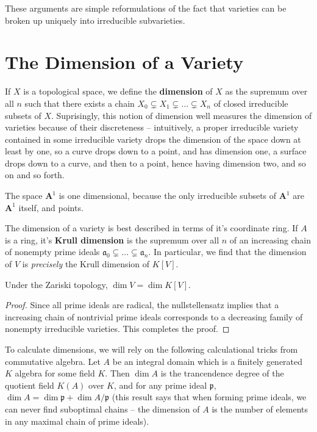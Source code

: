 These arguments are simple reformulations of the fact that varieties can be broken up uniquely into irreducible subvarieties.

\section{The Dimension of a Variety}

If $X$ is a topological space, we define the {\bf dimension} of $X$ as the supremum over all $n$ such that there exists a chain $X_0 \subsetneq X_1 \subsetneq \dots \subsetneq X_n$ of closed irreducible subsets of $X$. Suprisingly, this notion of dimension well measures the dimension of varieties because of their discreteness -- intuitively, a proper irreducible variety contained in some irreducible variety drops the dimension of the space down at least by one, so a curve drops down to a point, and has dimension one, a surface drops down to a curve, and then to a point, hence having dimension two, and so on and so forth.

\begin{example}
    The space $\mathbf{A}^1$ is one dimensional, because the only irreducible subsets of $\mathbf{A}^1$ are $\mathbf{A}^1$ itself, and points.
\end{example}

The dimension of a variety is best described in terms of it's coordinate ring. If $A$ is a ring, it's {\bf Krull dimension} is the supremum over all $n$ of an increasing chain of nonempty prime ideals $\mathfrak{a}_0 \subsetneq \dots \subsetneq \mathfrak{a}_n$. In particular, we find that the dimension of $V$ is {\it precisely} the Krull dimension of $K[V]$.

\begin{theorem}
    Under the Zariski topology, $\dim V = \dim K[V]$.
\end{theorem}
\begin{proof}
    Since all prime ideals are radical, the nullstellensatz implies that a increasing chain of nontrivial prime ideals corresponds to a decreasing family of nonempty irreducible varieties. This completes the proof.
\end{proof}

To calculate dimensions, we will rely on the following calculational tricks from commutative algebra. Let $A$ be an integral domain which is a finitely generated $K$ algebra for some field $K$. Then $\dim A$ is the trancendence degree of the quotient field $K(A)$ over $K$, and for any prime ideal $\mathfrak{p}$, $\dim A = \dim \mathfrak{p} + \dim A/\mathfrak{p}$ (this result says that when forming prime ideals, we can never find suboptimal chains -- the dimension of $A$ is the number of elements in any maximal chain of prime ideals).

